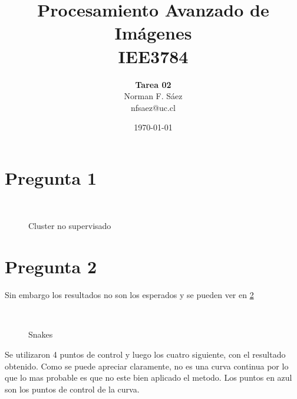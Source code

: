\documentclass[a4paper,10pt]{article}
\title{Procesamiento Avanzado de Imágenes\\IEE3784}
\author{\textbf{Tarea 02}\\Norman F. Sáez\\nfsaez@uc.cl}
\date{\today}
\begin{document}
\maketitle
\section{Pregunta 1}
\begin{figure}[ht!]
  \centering
  ~ 
  \caption{Cluster no supervisado}
  \label{fig:p1}
\end{figure}

\section{Pregunta 2}
Sin embargo los resultados no son los esperados y se pueden ver en \ref{fig:p2}
\begin{figure}[ht!]
  \centering
  ~ 
  \caption{Snakes}
  \label{fig:p2}
\end{figure}
Se utilizaron 4 puntos de control y luego los cuatro siguiente, con el resultado obtenido. Como se puede apreciar claramente, no es una curva continua
por lo que lo mas probable es que no este bien aplicado el metodo. Los puntos en azul son los puntos de control de la curva.
\end{document}
